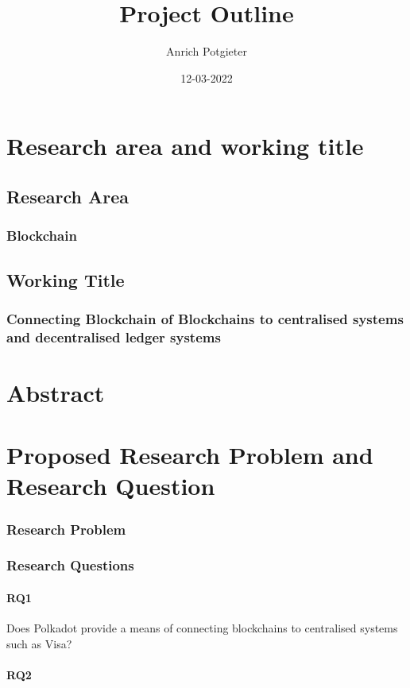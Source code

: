 \documentclass[12pt]{article}
\title{Project Outline}
\author{Anrich Potgieter}
\date{12-03-2022}
\begin{document}
\maketitle
\tableofcontents

\section{Research area and working title}
\subsection{Research Area}
\subsubsection{Blockchain}

\subsection{Working Title}
\subsubsection{Connecting Blockchain of Blockchains to centralised systems and decentralised ledger systems}

\section{Abstract}

\section{Proposed Research Problem and Research Question}
\subsubsection{Research Problem}

\subsubsection{Research Questions}
\paragraph{RQ1} Does Polkadot provide a means of connecting blockchains to centralised systems such as Visa?
\paragraph{RQ2} 
\end{document}
